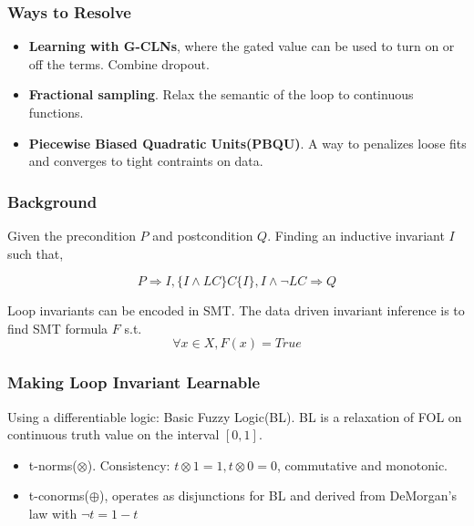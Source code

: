 \documentclass[11pt]{beamer}
\begin{document}
\begin{frame}\frametitle{Ways to Resolve}
\begin{itemize}

\item \textbf{Learning with G-CLNs}, where the gated value can be used to turn on or off the terms. Combine dropout.

\item \textbf{Fractional sampling}. Relax the semantic of the loop to continuous functions.

\item \textbf{Piecewise Biased Quadratic Units(PBQU)}. A way to penalizes loose fits and converges to tight contraints on data.

\end{itemize}
\end{frame}
\begin{frame}\frametitle{Background}
\begin{definition}
Given the precondition $P$ and postcondition $Q$. Finding an inductive invariant $I$ such that,

\[P\Longrightarrow I, \{I\wedge LC\}C\{I\}, I\wedge \neg LC \Longrightarrow Q\]

\end{definition}
Loop invariants can be encoded in SMT. The data driven invariant inference is to find SMT formula $F$ s.t.
\[\forall x\in X, F(x) = True\]


\end{frame}

\begin{frame}\frametitle{Making Loop Invariant Learnable}
Using a differentiable logic: Basic Fuzzy Logic(BL). BL is a relaxation of FOL on continuous truth value on the interval $[0,1]$.

\begin{itemize}
\item t-norms($\otimes$). Consistency: $t \otimes 1 = 1, t \otimes 0 = 0$, commutative and monotonic.

\item t-conorms($\oplus$), operates as disjunctions for BL and derived from DeMorgan's law with $\neg t = 1 - t$ 
\end{itemize}




\end{frame}
\end{document}
